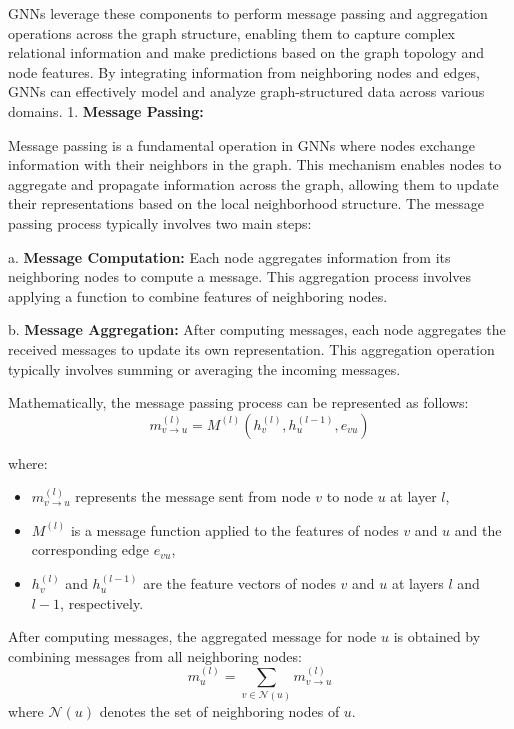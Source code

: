 GNNs leverage these components to perform message passing and aggregation operations across the graph structure, enabling them to capture complex relational information and make predictions based on the graph topology and node features. By integrating information from neighboring nodes and edges, GNNs can effectively model and analyze graph-structured data across various domains.
1. \textbf{Message Passing:}

Message passing is a fundamental operation in GNNs where nodes exchange information with their neighbors in the graph. This mechanism enables nodes to aggregate and propagate information across the graph, allowing them to update their representations based on the local neighborhood structure. The message passing process typically involves two main steps:

a. \textbf{Message Computation:} Each node aggregates information from its neighboring nodes to compute a message. This aggregation process involves applying a function to combine features of neighboring nodes.

b. \textbf{Message Aggregation:} After computing messages, each node aggregates the received messages to update its own representation. This aggregation operation typically involves summing or averaging the incoming messages. 

Mathematically, the message passing process can be represented as follows:
\[
m_{v \rightarrow u}^{(l)} = M^{(l)}(h_v^{(l)}, h_u^{(l-1)}, e_{vu})
\]

where:
\begin{itemize}
    \item $m_{v \rightarrow u}^{(l)}$ represents the message sent from node $v$ to node $u$ at layer $l$,
    \item $M^{(l)}$ is a message function applied to the features of nodes $v$ and $u$ and the corresponding edge $e_{vu}$,
    \item $h_v^{(l)}$ and $h_u^{(l-1)}$ are the feature vectors of nodes $v$ and $u$ at layers $l$ and $l-1$, respectively.
\end{itemize}

After computing messages, the aggregated message for node $u$ is obtained by combining messages from all neighboring nodes:
\[
m_u^{(l)} = \sum_{v \in \mathcal{N}(u)} m_{v \rightarrow u}^{(l)}
\]
where $\mathcal{N}(u)$ denotes the set of neighboring nodes of $u$.

